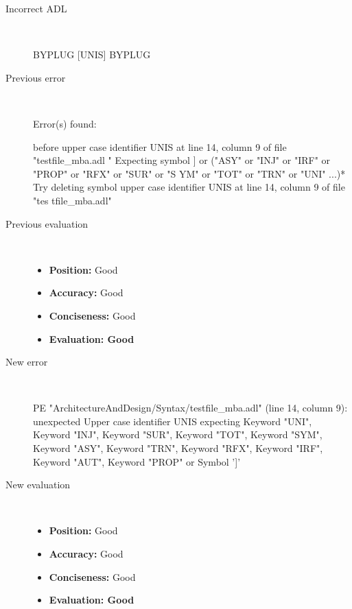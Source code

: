 \begin{description}
  \item[Incorrect ADL]~\\
\begin{adl}
BYPLUG [UNIS] BYPLUG\end{adl}
  \item[Previous error]~\\
\begin{haskell}
Error(s) found:

before upper case identifier UNIS at line 14, column 9 of file "testfile_mba.adl
"
Expecting symbol ] or ("ASY" or "INJ" or "IRF" or "PROP" or "RFX" or "SUR" or "S
YM" or "TOT" or "TRN" or "UNI" ...)*
Try deleting symbol upper case identifier UNIS at line 14, column 9 of file "tes
tfile_mba.adl"
\end{haskell}
  \item[Previous evaluation]~\\
    \begin{itemize}
    \item \textbf{Position:} Good
    \item \textbf{Accuracy:} Good
    \item \textbf{Conciseness:} Good
    \item \textbf{Evaluation: Good}
    \end{itemize}
  \item[New error]~\\
\begin{haskell}
PE "ArchitectureAndDesign/Syntax/testfile_mba.adl" (line 14, column 9):
unexpected Upper case identifier UNIS
expecting Keyword "UNI", Keyword "INJ", Keyword "SUR", Keyword "TOT", Keyword "SYM", Keyword "ASY", Keyword "TRN", Keyword "RFX", Keyword "IRF", Keyword "AUT", Keyword "PROP" or Symbol ']'
\end{haskell}
  \item[New evaluation]~\\
    \begin{itemize}
    \item \textbf{Position:} Good
    \item \textbf{Accuracy:} Good
    \item \textbf{Conciseness:} Good
    \item \textbf{Evaluation: Good}
    \end{itemize}
  \end{description}

\hrulefill

